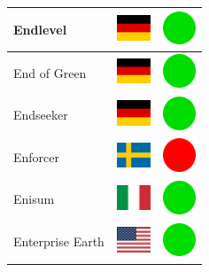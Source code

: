 \documentclass[12pt, a4paper, twoside]{report}
\begin{document}
\begin{center}
\begin{longtable}{|p{5cm}|p{2cm}|p{2cm}|}
 Endlevel                                                   & \includegraphics[width=1cm]{../4x3/de} &   \includegraphics[width=1cm]{../likes/y} \\ \hline
 End of Green                                               & \includegraphics[width=1cm]{../4x3/de} &   \includegraphics[width=1cm]{../likes/y} \\ \hline
 Endseeker                                                  & \includegraphics[width=1cm]{../4x3/de} &   \includegraphics[width=1cm]{../likes/y} \\ \hline
 Enforcer                                                   & \includegraphics[width=1cm]{../4x3/se} &   \includegraphics[width=1cm]{../likes/n} \\ \hline
 Enisum                                                     & \includegraphics[width=1cm]{../4x3/it} &   \includegraphics[width=1cm]{../likes/y} \\ \hline
 Enterprise Earth                                           & \includegraphics[width=1cm]{../4x3/us} &   \includegraphics[width=1cm]{../likes/y} \\ \hline

\end{longtable}
\end{center}
\end{document}
